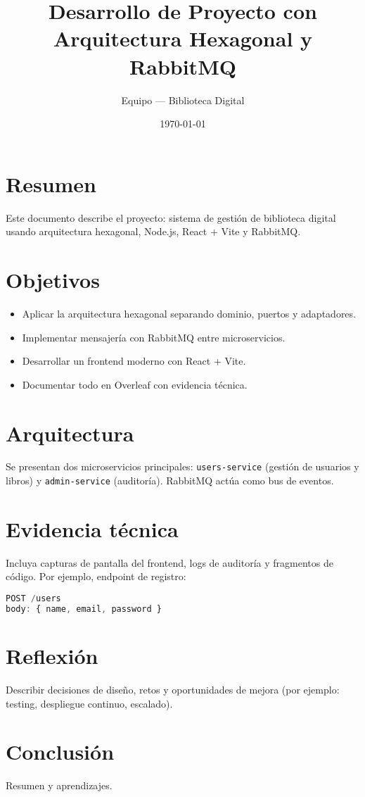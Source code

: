 \documentclass{article}
\title{Desarrollo de Proyecto con Arquitectura Hexagonal y RabbitMQ}
\author{Equipo — Biblioteca Digital}
\date{\today}
\begin{document}
\maketitle

\section*{Resumen}
Este documento describe el proyecto: sistema de gestión de biblioteca digital usando arquitectura hexagonal, Node.js, React + Vite y RabbitMQ.

\section{Objetivos}
\begin{itemize}
\item Aplicar la arquitectura hexagonal separando dominio, puertos y adaptadores.
\item Implementar mensajería con RabbitMQ entre microservicios.
\item Desarrollar un frontend moderno con React + Vite.
\item Documentar todo en Overleaf con evidencia técnica.
\end{itemize}

\section{Arquitectura}
Se presentan dos microservicios principales: \texttt{users-service} (gestión de usuarios y libros) y \texttt{admin-service} (auditoría). RabbitMQ actúa como bus de eventos.

\section{Evidencia técnica}
Incluya capturas de pantalla del frontend, logs de auditoría y fragmentos de código. Por ejemplo, endpoint de registro:
\begin{lstlisting}[language=JavaScript]
POST /users
body: { name, email, password }
\end{lstlisting}

\section{Reflexión}
Describir decisiones de diseño, retos y oportunidades de mejora (por ejemplo: testing, despliegue continuo, escalado).

\section{Conclusión}
Resumen y aprendizajes.
\end{document}
